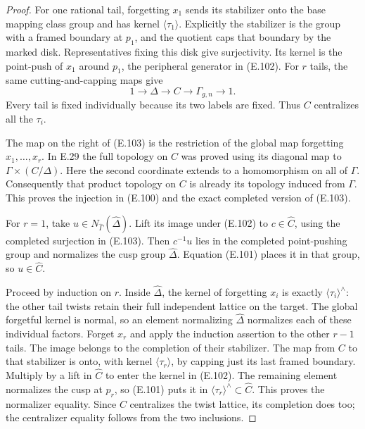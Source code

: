 \begin{proof}
For one rational tail, forgetting $x_1$ sends its stabilizer
onto the base mapping class group and has kernel
$\langle\tau_1\rangle$.  Explicitly the stabilizer is the
group with a framed boundary at $p_1$, and the quotient caps
that boundary by the marked disk.  Representatives fixing
this disk give surjectivity.  Its kernel is the point-push
of $x_1$ around $p_1$, the peripheral generator in (E.102).
For $r$ tails, the same cutting-and-capping maps give
\[
 1\longrightarrow\Delta\longrightarrow C\longrightarrow
                 \Gamma_{g,n}\longrightarrow1.               \tag{E.103}
\]
Every tail is fixed individually because its two labels are
fixed.  Thus $C$ centralizes all the $\tau_i$.

The map on the right of (E.103) is the restriction of the
global map forgetting $x_1,\ldots,x_r$.  In E.29 the full
topology on $C$ was proved using its diagonal map to
$\Gamma\times(C/\Delta)$.  Here the second coordinate
extends to a homomorphism on all of $\Gamma$.
Consequently that product topology on $C$ is already its
topology induced from $\Gamma$.  This proves the injection
in (E.100) and the exact completed version of (E.103).

For $r=1$, take $u\in N_{\widehat\Gamma}(\widehat\Delta)$.
Lift its image under (E.102) to $c\in\widehat C$, using
the completed surjection in (E.103).  Then $c^{-1}u$ lies
in the completed point-pushing group and normalizes the
cusp group $\widehat\Delta$.  Equation (E.101) places it
in that group, so $u\in\widehat C$.

Proceed by induction on $r$.  Inside $\widehat\Delta$,
the kernel of forgetting $x_i$ is exactly
$\langle\tau_i\rangle^{\wedge}$: the other tail twists
retain their full independent lattice on the target.
The global forgetful kernel is normal, so an element
normalizing $\widehat\Delta$ normalizes each of these
individual factors.  Forget $x_r$ and apply the induction
assertion to the other $r-1$ tails.  The image belongs to
the completion of their stabilizer.  The map from $C$
to that stabilizer is onto, with kernel
$\langle\tau_r\rangle$, by capping just its last framed
boundary.  Multiply by a lift in $\widehat C$ to enter
the kernel in (E.102).  The remaining element normalizes
the cusp at $p_r$, so (E.101) puts it in
$\langle\tau_r\rangle^{\wedge}\subset\widehat C$.
This proves the normalizer equality.  Since $C$ centralizes
the twist lattice, its completion does too; the centralizer
equality follows from the two inclusions.


\end{proof}
